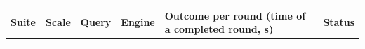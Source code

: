 \begin{longtable}{llllll}
\toprule
Suite & Scale & Query & Engine & Outcome per round (time of a completed round, s) & Status \\
\midrule
\endhead
\bottomrule
\endfoot
\end{longtable}
